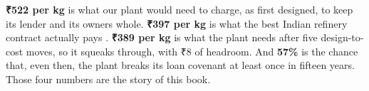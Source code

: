 \vspace{4pt}

\vspace{6pt}
\begin{plainwords}
\textbf{₹522 per kg} is what our plant would need to charge, as first designed, to keep its lender and its owners whole. \textbf{₹397 per kg} is what the best Indian refinery contract actually pays \cite{jmkiocl2025}. \textbf{₹389 per kg} is what the plant needs after five design-to-cost moves, so it squeaks through, with ₹8 of headroom. And \textbf{57\%} is the chance that, even then, the plant breaks its loan covenant at least once in fifteen years. Those four numbers are the story of this book.
\end{plainwords}
\newpage


